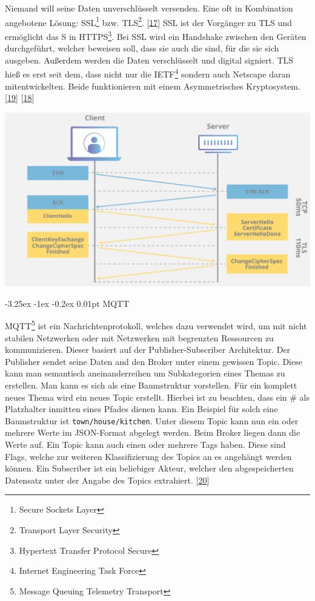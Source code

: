 \documentclass[
    headings=optiontotocandhead,%
    twoside,
    numbers=noenddot,%
    12pt, %
    titlepage, %
    parskip=full, %
    listof=leveldown, 
    numbers=noenddot, %
    a4paper,DIV=14,
    BCOR=15mm,
]{scrbook}
\makeatletter
\newcommand{\passthrough}[1]{#1}
\let\origfigure=\figure
\let\endorigfigure=\endfigure
\renewenvironment{figure}[1][]{%
   \origfigure[H]
}{%
   \endorigfigure
}
\renewcommand\paragraph{\@startsection{paragraph}{4}{\z@}%
    {-3.25ex \@plus -1ex \@minus -0.2ex}%
    {0.01pt}%
    {\raggedsection\normalfont\sectfont\nobreak\size@paragraph}%
  }
\makeatother
\begin{document}
Niemand will seine Daten unverschlüsselt versenden. Eine oft in
Kombination angebotene Lösung: SSL\footnote{Secure Sockets Layer} bzw.
TLS\footnote{Transport Layer Security}.
{[}\protect\hyperlink{ref-reverse-proxy}{17}{]} SSL ist der Vorgänger zu
TLS und ermöglicht das S in HTTPS\footnote{Hypertext Transfer Protocol
  Secure}. Bei SSL wird ein Handshake zwischen den Geräten durchgeführt,
welcher beweisen soll, dass sie auch die sind, für die sie sich
ausgeben. Außerdem werden die Daten verschlüsselt und digital signiert.
TLS hieß es erst seit dem, dass nicht nur die IETF\footnote{Internet
  Engineering Task Force} sondern auch Netscape daran mitentwickelten.
Beide funktionieren mit einem Asymmetrisches Kryptosystem.
{[}\protect\hyperlink{ref-ssl}{19}{]}
{[}\protect\hyperlink{ref-tls}{18}{]}

\begin{figure}
\centering
\includegraphics[width=1\textwidth,height=\textheight]{img/Schrempf/tls-ssl-handshake.png}
\caption{Funktionsweise eines TLS Handshakes
{[}\protect\hyperlink{ref-tls}{18}{]}}
\end{figure}

\hypertarget{mqtt-2}{%
\paragraph{MQTT}\label{mqtt-2}}

MQTT\footnote{Message Queuing Telemetry Transport} ist ein
Nachrichtenprotokoll, welches dazu verwendet wird, um mit nicht stabilen
Netzwerken oder mit Netzwerken mit begrenzten Ressourcen zu
kommunizieren. Dieser basiert auf der Publisher-Subscriber Architektur.
Der Publisher sendet seine Daten and den Broker unter einem gewissen
Topic. Diese kann man semantisch aneinanderreihen um Subkategorien eines
Themas zu erstellen. Man kann es sich als eine Baumstruktur vorstellen.
Für ein komplett neues Thema wird ein neues Topic erstellt. Hierbei ist
zu beachten, dass ein \# als Platzhalter inmitten eines Pfades dienen
kann. Ein Beispiel für solch eine Baumstruktur ist
\passthrough{\lstinline!town/house/kitchen!}. Unter diesem Topic kann
nun ein oder mehrere Werte im JSON-Format abgelegt werden. Beim Broker
liegen dann die Werte auf. Ein Topic kann auch einen oder mehrere Tags
haben. Diese sind Flags, welche zur weiteren Klassifizierung des Topics
an es angehängt werden können. Ein Subscriber ist ein beliebiger Akteur,
welcher den abgespeicherten Datensatz unter der Angabe des Topics
extrahiert. {[}\protect\hyperlink{ref-mqtt-hivemq}{20}{]}
\end{document}
